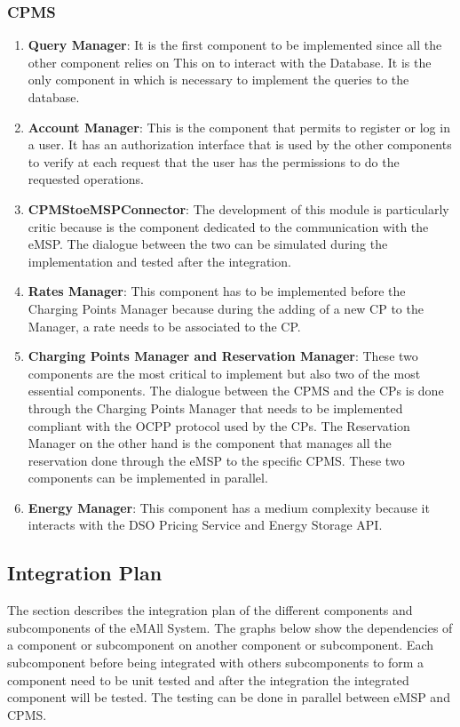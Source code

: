 \subsubsection{CPMS}
\begin{enumerate}
    \item \textbf{Query Manager}: It is the first component to be implemented since all the other component relies on This
    on to interact with the Database. It is the only component in which is necessary to implement the queries to the database.
    \item \textbf{Account Manager}: This is the component that permits to register or log in a user. It has an authorization interface that 
    is used by the other components to verify at each request that the user has the permissions to do the requested operations.
    \item \textbf{CPMStoeMSPConnector}: The development of this module is particularly critic because is the component dedicated
    to the communication with the eMSP. The dialogue between the two can be simulated during the implementation and tested after the integration.
    \item \textbf{Rates Manager}: This component has to be implemented before the Charging Points Manager because during the adding 
    of a new CP to the Manager, a rate needs to be associated to the CP.
    \item \textbf{Charging Points Manager and Reservation Manager}: These two components are the most critical to implement but also two 
    of the most essential components. The dialogue between the CPMS and the CPs is done through the Charging Points Manager that 
    needs to be implemented compliant with the OCPP protocol used by the CPs. The Reservation Manager on the other hand is the component
    that manages all the reservation done through the eMSP to the specific CPMS. These two components can be implemented in parallel.
    \item \textbf{Energy Manager}: This component has a medium complexity because it interacts with the DSO Pricing Service and Energy Storage API. 
\end{enumerate}

\subsection{Integration Plan}
The section describes the integration plan of the different components and subcomponents of the eMAll System. 
The graphs below show the dependencies of a component or subcomponent on another component or subcomponent. Each subcomponent before being integrated with others subcomponents
to form a component need to be unit tested and after the integration the integrated component will be tested.
The testing can be done in parallel between eMSP and CPMS.

